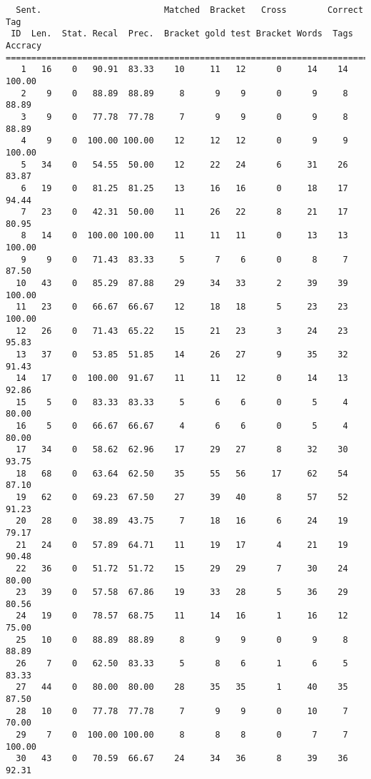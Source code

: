 \scriptsize
\begin{verbatim}
  Sent.                        Matched  Bracket   Cross        Correct Tag
 ID  Len.  Stat. Recal  Prec.  Bracket gold test Bracket Words  Tags Accracy
============================================================================
   1   16    0   90.91  83.33    10     11   12      0     14    14   100.00
   2    9    0   88.89  88.89     8      9    9      0      9     8    88.89
   3    9    0   77.78  77.78     7      9    9      0      9     8    88.89
   4    9    0  100.00 100.00    12     12   12      0      9     9   100.00
   5   34    0   54.55  50.00    12     22   24      6     31    26    83.87
   6   19    0   81.25  81.25    13     16   16      0     18    17    94.44
   7   23    0   42.31  50.00    11     26   22      8     21    17    80.95
   8   14    0  100.00 100.00    11     11   11      0     13    13   100.00
   9    9    0   71.43  83.33     5      7    6      0      8     7    87.50
  10   43    0   85.29  87.88    29     34   33      2     39    39   100.00
  11   23    0   66.67  66.67    12     18   18      5     23    23   100.00
  12   26    0   71.43  65.22    15     21   23      3     24    23    95.83
  13   37    0   53.85  51.85    14     26   27      9     35    32    91.43
  14   17    0  100.00  91.67    11     11   12      0     14    13    92.86
  15    5    0   83.33  83.33     5      6    6      0      5     4    80.00
  16    5    0   66.67  66.67     4      6    6      0      5     4    80.00
  17   34    0   58.62  62.96    17     29   27      8     32    30    93.75
  18   68    0   63.64  62.50    35     55   56     17     62    54    87.10
  19   62    0   69.23  67.50    27     39   40      8     57    52    91.23
  20   28    0   38.89  43.75     7     18   16      6     24    19    79.17
  21   24    0   57.89  64.71    11     19   17      4     21    19    90.48
  22   36    0   51.72  51.72    15     29   29      7     30    24    80.00
  23   39    0   57.58  67.86    19     33   28      5     36    29    80.56
  24   19    0   78.57  68.75    11     14   16      1     16    12    75.00
  25   10    0   88.89  88.89     8      9    9      0      9     8    88.89
  26    7    0   62.50  83.33     5      8    6      1      6     5    83.33
  27   44    0   80.00  80.00    28     35   35      1     40    35    87.50
  28   10    0   77.78  77.78     7      9    9      0     10     7    70.00
  29    7    0  100.00 100.00     8      8    8      0      7     7   100.00
  30   43    0   70.59  66.67    24     34   36      8     39    36    92.31

\end{verbatim}
